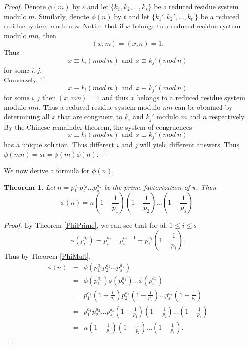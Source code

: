 \documentclass[12pt,letterpaper]{book}
\newtheorem{theorem}{Theorem}
\begin{document}
\begin{proof}
Denote $\phi(m)$ by $s$ and let $\{k_1,k_2,...,k_s\}$ be a reduced
residue system modulo $m$.  Similarly, denote $\phi(n)$ by $t$ and
let $\{k_1',k_2',...,k_t'\}$ be a reduced residue system modulo $n$.
Notice that if $x$ belongs to a reduced residue system modulo $mn$,
then
\begin{equation*}
(x,m)=(x,n)=1.
\end{equation*}
Thus
\begin{equation*}
x\equiv k_i(mod\ m) \mbox{ and} \ \  x\equiv k_j'(mod \ n)
\end{equation*}
for some $i,j$.\\ Conversely, if
\begin{equation*}
x\equiv k_i(mod\ m) \mbox{ and} \ \  x\equiv k_j'(mod \ n)
\end{equation*}
for some $i,j$ then $(x,mn)=1$ and thus $x$ belongs to a reduced residue
system modulo $mn$. Thus a reduced residue system modulo $mn$ can be
obtained by determining all $x$ that are congruent to $k_i$ and
$k_j'$ modulo $m$ and $n$ respectively.  By the Chinese remainder
theorem, the system of congruences
\begin{equation*}
x\equiv k_i(mod\ m) \mbox{ and} \ \  x\equiv k_j'(mod \ n)
\end{equation*}
has a unique solution. Thus different $i$ and $j$ will yield
different answers. Thus $\phi(mn)=st=\phi(m)\phi(n)$.
\end{proof}

We now derive a formula for $\phi(n)$.

\begin{theorem}
Let $n=p_1^{a_1}p_2^{a_2}...p_s^{a_s}$ be the prime factorization of
$n$.  Then
\begin{equation*}
\phi(n)=n\left(1-\frac{1}{p_1}\right)\left(1-\frac{1}{p_2}\right)...\left(1-\frac{1}{p_s}\right).
\end{equation*}
\end{theorem}

\begin{proof}
By Theorem \ref{PhiPrime}, we can see that for all $1\leq i\leq s$
\begin{equation*}
\phi(p_i^{a_i})=p_i^{a_i}-p_i^{a_i-1}=p_i^{a_i}\left(1-\frac{1}{p_i}\right).
\end{equation*}
Thus by Theorem \ref{PhiMult},
\begin{eqnarray*}
\phi(n)&=&\phi(p_1^{a_1}p_2^{a_2}...p_s^{a_s})\\&=&
\phi(p_1^{a_1})\phi(p_2^{a_2})...\phi(p_s^{a_s})\\&=&p_1^{a_1}\left(1-\frac{1}{p_1}\right)
p_2^{a_2}\left(1-\frac{1}{p_2}\right)...p_s^{a_s}\left(1-\frac{1}{p_s}\right)\\&=&
p_1^{a_1}p_2^{a_2}...p_s^{a_s}\left(1-\frac{1}{p_1}\right)\left(1-\frac{1}{p_2}\right)...
\left(1-\frac{1}{p_s}\right)\\&=&
n\left(1-\frac{1}{p_1}\right)\left(1-\frac{1}{p_2}\right)...\left(1-\frac{1}{p_s}\right).
\end{eqnarray*}
\end{proof}
\end{document}

